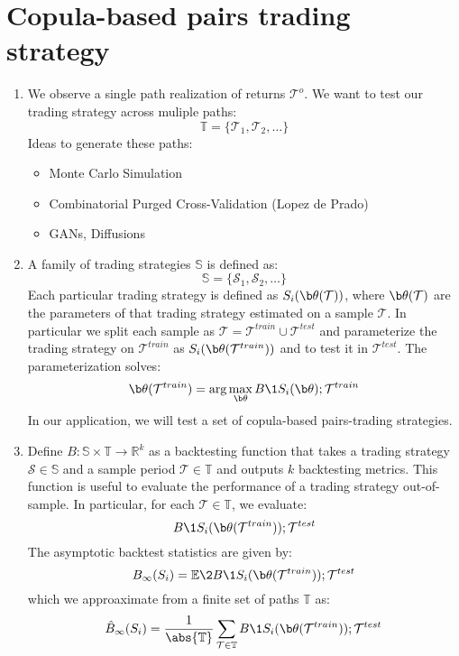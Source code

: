 \section{Copula-based pairs trading strategy}

\begin{enumerate}
\item We observe a single path realization of returns $\mathcal{T}^o$.
We want to test our trading strategy across muliple paths: 
$$
\mathbb{T} =\{\mathcal T_1, \mathcal T_2, \ldots\}
$$ 
Ideas to generate these paths: 
\begin{itemize}
  \item Monte Carlo Simulation
  \item Combinatorial Purged Cross-Validation (Lopez de Prado)
  \item GANs, Diffusions
\end{itemize}

\item A family of trading strategies $\mathbb{S}$ is defined as: 
$$
\mathbb{S}=\{\mathcal S_1, \mathcal S_2, \ldots \}
$$
Each particular trading strategy is defined as 
$S_i(\b \theta(\mathcal T))$, where $\b \theta(\mathcal T)$ are the parameters of that trading strategy estimated on a sample $\mathcal T$. In particular we split each sample as $\mathcal T=\mathcal T^{train} \cup \mathcal T^{test}$ and parameterize the trading strategy on $\mathcal T^{train}$ as $S_i(\b \theta(\mathcal T^{train}))$ and to test it in $\mathcal T^{test}$. The parameterization solves:
$$
\b \theta(\mathcal T^{train}) = \arg \max_{\b \theta} B\1{S_i(\b \theta) ; \mathcal T^{train}}
$$
In our application, we will test a set of copula-based pairs-trading strategies. 
\item Define $B: \mathbb S \times \mathbb T\to \mathbb{R}^k$ as a backtesting function that takes a trading strategy $\mathcal S\in\mathbb{S}$ and a sample period $\mathcal T\in\mathbb{T}$ and outputs $k$ backtesting metrics. This function is useful to evaluate the performance of a trading strategy out-of-sample. In particular, for each $\mathcal{T}\in\mathbb{T}$, we evaluate: 
$$
B\1{S_i(\b \theta(\mathcal T^{train})) ; \mathcal T^{test}}
$$
The asymptotic backtest statistics are given by:
$$
B_{\infty}(S_i) = \mathbb{E}\2{B\1{S_i(\b \theta(\mathcal T^{train})) ; \mathcal T^{test}}}
$$
which we approaximate from a finite set of paths $\mathbb{T}$ as: 
$$
\hat B_{\infty}(S_i) = \frac{1}{\abs{\mathbb{T}}} \sum_{\mathcal T\in \mathbb{T}} 
B\1{S_i(\b \theta(\mathcal T^{train})) ; \mathcal T^{test}}
$$




\end{enumerate}
